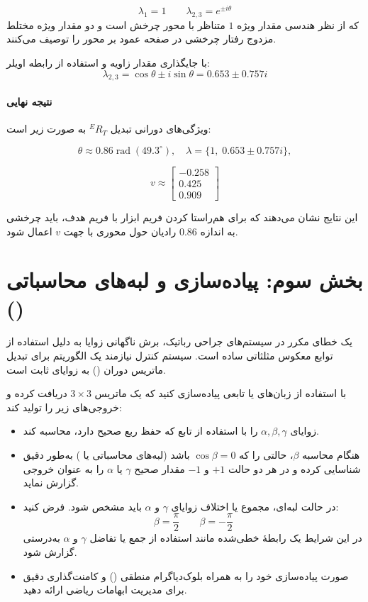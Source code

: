\documentclass{article}
\begin{document}
\[
\lambda_1 = 1
\qquad
\lambda_{2,3} = e^{\pm i\theta}
\]
که از نظر هندسی مقدار ویژه \(1\) متناظر با محور چرخش است و دو مقدار ویژه مختلط مزدوج رفتار چرخشی در صفحه عمود بر محور را توصیف می‌کنند.

با جایگذاری مقدار زاویه و استفاده از رابطه اویلر:
\[
\lambda_{2,3} =
\cos\theta \pm i\sin\theta
= 0.653 \pm 0.757 i
\]

\paragraph{نتیجه نهایی}

ویژگی‌های دورانی تبدیل \( {}^{E}R_{T} \) به صورت زیر است:

\[
\theta \approx 0.86 \; \text{rad} \; (49.3^\circ),
\quad
\lambda =
\{1,\; 0.653 \pm 0.757 i\},
\]

\[
v \approx
\begin{bmatrix}
	-0.258\\
	0.425\\
	0.909
\end{bmatrix}
\]

این نتایج نشان می‌دهند که برای هم‌راستا کردن فریم ابزار با فریم هدف، باید چرخشی به اندازه \(0.86\) رادیان حول محوری با جهت \(v\) اعمال شود.


\newpage

\section{بخش سوم: پیاده‌سازی و لبه‌های محاسباتی ()}

یک خطای مکرر در سیستم‌های جراحی رباتیک، برش ناگهانی زوایا به دلیل استفاده از توابع معکوس مثلثاتی ساده است.
سیستم کنترل نیازمند یک الگوریتم برای تبدیل ماتریس دوران () به زوایای ثابت  است.

با استفاده از زبان‌های  یا  تابعی پیاده‌سازی کنید که یک ماتریس $3\times3$ دریافت کرده و خروجی‌های زیر را تولید کند:

\begin{itemize}
	\item زوایای $\alpha,\beta,\gamma$ را با استفاده از تابع  که حفظ ربع صحیح دارد، محاسبه کند.
	
	\item هنگام محاسبه $\beta$، حالتی را که $\cos\beta = 0$ باشد (لبه‌های محاسباتی یا ) به‌طور دقیق شناسایی کرده و در هر دو حالت $+1$ و $-1$ مقدار صحیح $\gamma$ یا $\alpha$ را به عنوان خروجی گزارش نماید.
	
	\item در حالت لبه‌ای، مجموع یا اختلاف زوایای $\gamma$ و $\alpha$ باید مشخص شود. فرض کنید:
	\[
	\beta = \frac{\pi}{2}
	\qquad
	\beta = -\frac{\pi}{2}
	\]
	در این شرایط یک رابطهٔ خطی‌شده مانند استفاده از جمع یا تفاضل $\gamma$ و $\alpha$ به‌درستی گزارش شود.
	
	\item صورت پیاده‌سازی خود را به همراه بلوک‌دیاگرام منطقی () و کامنت‌گذاری دقیق برای مدیریت ابهامات ریاضی ارائه دهید.
\end{itemize}
\end{document}
